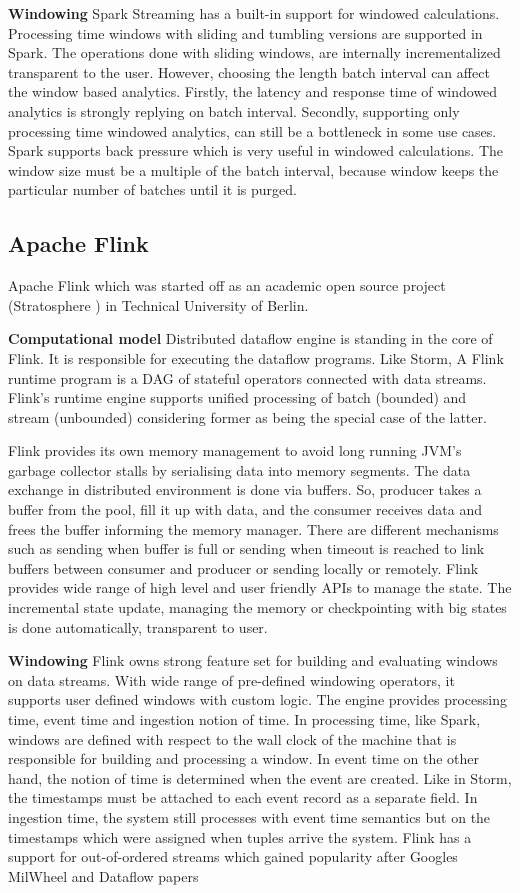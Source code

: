 \textbf{Windowing}
Spark Streaming has a built-in support for windowed calculations. Processing time windows with sliding and tumbling versions are  supported in Spark. The operations done with sliding windows, are internally incrementalized transparent to the user.  However, choosing the length batch interval can affect the window based analytics. Firstly, the latency and response time of windowed analytics is strongly replying on batch interval. Secondly, supporting only processing time windowed analytics, can still be a bottleneck in some use cases. Spark supports back pressure which is very useful in windowed calculations. The window size must be a multiple of the batch interval, because window keeps the particular number of batches until it is purged. 




\subsection{Apache Flink}
Apache Flink which was started off as an academic open source project (Stratosphere \cite{alexandrov2014stratosphere}) in Technical University of  Berlin.

\textbf{Computational model}
Distributed dataflow engine is standing in the core of Flink. It is responsible for executing the dataflow programs. Like Storm, A Flink runtime program is a DAG of stateful operators connected with data streams. Flink's runtime engine supports unified processing of batch (bounded) and stream (unbounded) considering former as being the special case of the latter.

Flink provides its own memory management to avoid long running JVM's garbage collector stalls by serialising data into memory segments. 
The data exchange in distributed environment is done via buffers. So, producer takes a buffer from the pool, fill it up with data, and the consumer receives data and frees the buffer informing the memory manager. There are different mechanisms such as sending when buffer is full or sending when timeout is reached to link buffers between consumer and producer or sending locally or remotely. Flink provides wide range of high level and user friendly APIs to manage the state. The incremental state update, managing the memory or checkpointing with big states is done automatically, transparent to user. 

\textbf{Windowing}
Flink owns strong feature set for building and evaluating windows on data streams. With wide range of pre-defined windowing operators, it supports user defined windows with custom logic. The engine provides processing time, event time and ingestion notion of time.  In processing time, like Spark,  windows are defined with respect to the wall clock of the machine that is responsible for building and processing  a window. In event time on the other hand, the notion of time is  determined when the event are created. Like in Storm, the timestamps must be attached to each event record as a separate field. In ingestion time, the system still processes with event time semantics but on the timestamps which were assigned when tuples arrive the system. Flink has a support for out-of-ordered streams which gained popularity after Googles MilWheel and Dataflow papers \cite{akidau2013millwheel,akidau2015dataflow}

